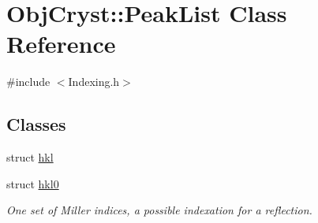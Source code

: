 \hypertarget{class_obj_cryst_1_1_peak_list}{}\section{Obj\+Cryst\+::Peak\+List Class Reference}
\label{class_obj_cryst_1_1_peak_list}


{\ttfamily \#include $<$Indexing.\+h$>$}

\subsection*{Classes}
\begin{DoxyCompactItemize}
\item 
struct \mbox{\hyperlink{struct_obj_cryst_1_1_peak_list_1_1hkl}{hkl}}
\item 
struct \mbox{\hyperlink{struct_obj_cryst_1_1_peak_list_1_1hkl0}{hkl0}}
\begin{DoxyCompactList}\small\item\em One set of Miller indices, a possible indexation for a reflection. \end{DoxyCompactList}\end{DoxyCompactItemize}
